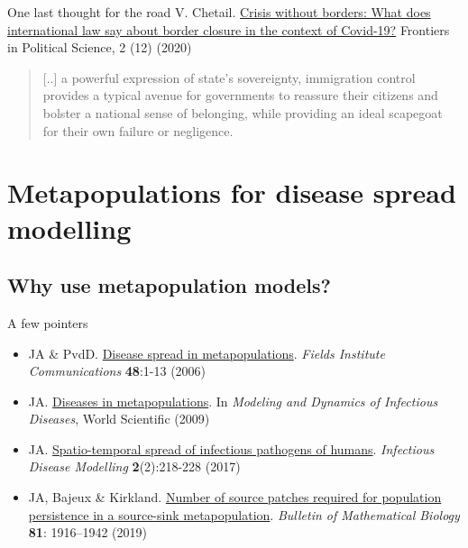\documentclass[aspectratio=169]{beamer}\usepackage[]{graphicx}\usepackage[]{xcolor}
\begin{document}
\begin{frame}{One last thought for the road}
	V. Chetail. \href{https://doi.org/10.3389/fpos.2020.606307}{Crisis without borders: What does international law say about border closure in the context of Covid-19?} Frontiers in Political Science, 2 (12) (2020)
	\vfill
	\begin{quote}\Large
		[..] a powerful expression of state's sovereignty, immigration control provides a typical avenue for governments to reassure their citizens and bolster a national sense of belonging, while providing an ideal scapegoat for their own failure or negligence.
	\end{quote}
\end{frame}

\section{Metapopulations for disease spread modelling}
\subsection{Why use metapopulation models?}


\begin{frame}{A few pointers}
	\begin{itemize}
		\item JA \& PvdD. \href{https://julien-arino.github.io/assets/pdf/papers/2006_ArinoPvdD-FIC48.pdf}{Disease spread in metapopulations}. \emph{Fields Institute Communications} \textbf{48}:1-13 (2006)
		\item JA. \href{https://julien-arino.github.io/assets/pdf/papers/2009_Arino-metapopulations.pdf}{Diseases in metapopulations}. In \emph{Modeling and Dynamics of Infectious Diseases}, World Scientific (2009)
		\item JA. \href{https://doi.org/10.1016/j.idm.2017.05.001}{Spatio-temporal spread of infectious pathogens of humans}. \emph{Infectious Disease Modelling} \textbf{2}(2):218-228 (2017)
		\item JA, Bajeux \& Kirkland. \href{https://doi.org/10.1007/s11538-019-00593-1}{Number of source patches required for population persistence in a source-sink metapopulation}. \emph{Bulletin of Mathematical Biology} \textbf{81}: 1916–1942 (2019) 
	\end{itemize}
\end{frame}
\end{document}
